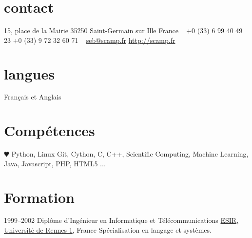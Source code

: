 \documentclass[]{friggeri-cv} %
\begin{document}


\begin{aside} %
\section{contact}
15, place de la Mairie
35250 Saint-Germain sur Ille
France
~
+0 (33) 6 99 40 49 23
+0 (33) 9 72 32 60 71
~
\href{mailto:seb@scamp.fr}{seb@scamp.fr}
\href{http://scamp.fr}{http://scamp.fr}
\section{langues}
Français et Anglais
\section{Compétences}
{\color{red} $\varheartsuit$} Python, %
Linux
Git, Cython, C, C++, Scientific Computing, Machine Learning, Java, Javascript, PHP, HTML5
...
\end{aside}


\section{Formation}

\begin{entrylist}
\entry
{1999--2002}
{Diplôme d'Ingénieur   {\normalfont en Informatique et Télécommunications}}
{\href{https://esir.univ-rennes1.fr}{ESIR, Université de Rennes 1}, France}
{Spécialisation en langage et systèmes.}
\end{entrylist}
\end{document}
